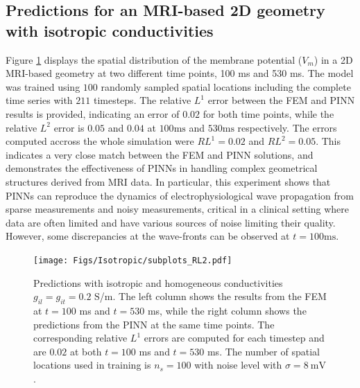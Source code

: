 \subsection{Predictions for an MRI-based 2D geometry with isotropic conductivities}

Figure \ref{fig:2D_MRI_iso} displays the spatial distribution of the membrane potential (\(V_m\)) in a 2D MRI-based geometry at two different time points, 100 ms and 530 ms. The model was trained using $100$ randomly sampled spatial locations including the complete time series with $211$ timesteps. The relative $L^1$ error between the FEM and PINN results is provided, indicating an error of $0.02$ for both time points, while the relative $L^2$ error is $0.05$ and $0.04$ at $100 \mathrm{ms}$ and $530 \mathrm{ms}$ respectively. The errors computed accross the whole simulation were $RL^1=0.02$ and $RL^2=0.05$.
This indicates a very close match between the FEM and PINN solutions, and demonstrates the effectiveness of PINNs in handling complex geometrical structures derived from MRI data. In particular, this experiment shows that PINNs can reproduce the dynamics of electrophysiological wave propagation from sparse measurements and noisy measurements, critical in a clinical setting where data are often limited and have various sources of noise limiting their quality. However, some discrepancies at the wave-fronts can be observed at $t=100\mathrm{ms}$.
\begin{figure}[H]
  \centering
  \texttt{[image: Figs/Isotropic/subplots\_RL2.pdf]}
  \caption{Predictions with isotropic and homogeneous conductivities \( g_{il} = g_{it} = 0.2 \) S/m. The left column shows the results from the FEM at \( t = 100 \) ms and \( t = 530 \) ms, while the right column shows the predictions from the PINN at the same time points. The corresponding relative \( L^1 \) errors are computed for each timestep and are $0.02$ at both \( t = 100 \) ms and \( t = 530 \) ms. The number of spatial locations used in training is $n_s=100$ with noise level with $\sigma=8~\mathrm{mV}$.  }
  \label{fig:2D_MRI_iso}
\end{figure}





%   
